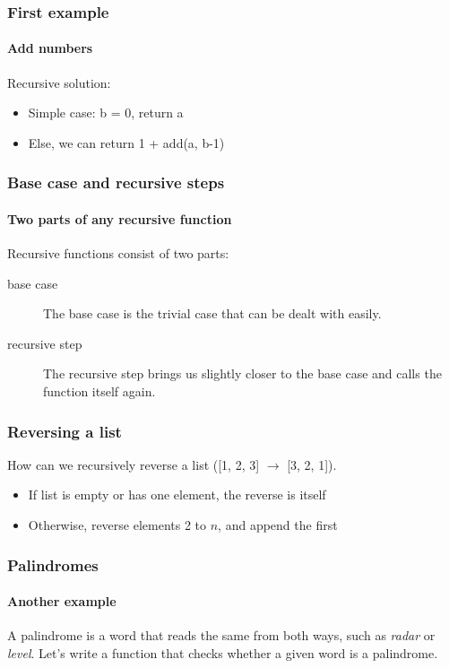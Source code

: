 \begin{frame}\frametitle{First example}
    \framesubtitle{Add numbers}

    Recursive solution:

    \begin{itemize}
        \item Simple case: b = 0, return a
        \item Else, we can return 1 + add(a, b-1)
    \end{itemize}
    \pause

\end{frame}

\begin{frame}\frametitle{Base case and recursive steps}
    \framesubtitle{Two parts of any recursive function}

    Recursive functions consist of two parts:

    \begin{description}
        \item[base case] The base case is the trivial case that can be dealt with
            easily.
        \item[recursive step] The recursive step brings us slightly closer to
            the base case and calls the function itself again.
    \end{description}

\end{frame}

\begin{frame}\frametitle{Reversing a list}

    How can we recursively reverse a list ([1, 2, 3] $\to$ [3, 2, 1]).

    \begin{itemize}
        \item If list is empty or has one element, the reverse is itself
        \item Otherwise, reverse elements 2 to $n$, and append the first
    \end{itemize}

    \pause


\end{frame}

\begin{frame}\frametitle{Palindromes}
    \framesubtitle{Another example}

    A palindrome is a word that reads the same from both ways, such as
    \emph{radar} or \emph{level}.
    \vfill
    Let's write a function that checks whether a given word is a palindrome.

\end{frame}

